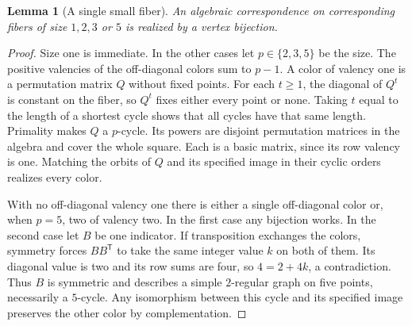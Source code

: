 \documentclass[11pt,reqno]{amsart}
\numberwithin{equation}{section}
\newtheorem{lemma}[theorem]{Lemma}
\theoremstyle{definition}
\begin{document}
\begin{lemma}[A single small fiber]\label{lem:single-small}
An algebraic correspondence on corresponding fibers of size $1,2,3$ or $5$ is realized by a vertex bijection.
\end{lemma}
\begin{proof}
Size one is immediate. In the other cases let $p\in\{2,3,5\}$ be the size. The positive valencies of the off-diagonal colors sum to $p-1$.
A color of valency one is a permutation matrix $Q$ without fixed points. For each $t\ge1$, the diagonal of $Q^t$ is constant on the fiber, so $Q^t$ fixes either every point or none. Taking $t$ equal to the length of a shortest cycle shows that all cycles have that same length. Primality makes $Q$ a $p$-cycle. Its powers are disjoint permutation matrices in the algebra and cover the whole square. Each is a basic matrix, since its row valency is one. Matching the orbits of $Q$ and its specified image in their cyclic orders realizes every color.

With no off-diagonal valency one there is either a single off-diagonal color or, when $p=5$, two of valency two. In the first case any bijection works. In the second case let $B$ be one indicator. If transposition exchanges the colors, symmetry forces $BB^{\mathsf T}$ to take the same integer value $k$ on both of them. Its diagonal value is two and its row sums are four, so $4=2+4k$, a contradiction. Thus $B$ is symmetric and describes a simple $2$-regular graph on five points, necessarily a $5$-cycle. Any isomorphism between this cycle and its specified image preserves the other color by complementation.
\end{proof}
\end{document}
